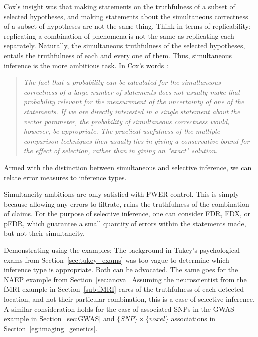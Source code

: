 \documentclass[review,12pt]{article}
\theoremstyle{definition}
\theoremstyle{definition}
\begin{document}
Cox's insight was that making statements on the truthfulness of a subset of selected hypotheses, and making statements about the simultaneous correctness of a subset of hypotheses are not the same thing. 
Think in terms of replicability: replicating a combination of phenomena is not the same as replicating each separately.
Naturally, the simultaneous truthfulness of the selected hypotheses, entails the truthfulness of each and every one of them. Thus, simultaneous inference is the more ambitious task.
In  Cox's words \cite{cox_remark_1965}:
\begin{quote}\em
The fact that a probability can be calculated for the simultaneous correctness of a large number of statements does not usually make that probability relevant for the measurement of
the uncertainty of one of the statements. If we are directly interested in a single statement about the vector parameter, the probability of simultaneous correctness would, however, be appropriate. The practical usefulness of the multiple comparison techniques then usually lies in giving a conservative bound for the effect of selection, rather than in giving an "exact" solution.
\end{quote}

Armed with the distinction between simultaneous and selective inference, we can relate error measures to inference types. 

Simultaneity ambitions are only satisfied with FWER control. This is simply because allowing any errors to filtrate, ruins the truthfulness of the combination of claims.
For the purpose of selective inference, one can consider FDR, FDX, or pFDR, which guarantee a small quantity of errors within the statements made, but not their simultaneity.

Demonstrating using the examples: 
The background in Tukey's psychological exams from Section~\ref{sec:tukey_exams} was too vague to determine which inference type is appropriate. Both can be advocated. 
The same goes for the NAEP example from Section~\ref{sec:anova}. 
Assuming the neuroscientist from the fMRI example in Section~\ref{sub:fMRI} cares of the truthfulness of each detected location, and not their particular combination, this is a case of selective inference. A similar consideration holds for the case of associated SNPs in the GWAS example in Section~\ref{sec:GWAS} and $\{SNP\} \times \{voxel\}$ associations in Section~\ref{eg:imaging_genetics}.
\end{document}
